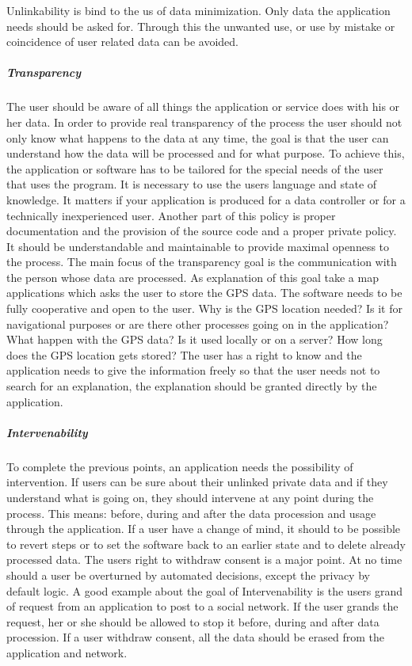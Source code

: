 Unlinkability is bind to the us of data minimization. Only data the application needs should be asked for. Through this the unwanted use, or use by mistake or coincidence of user related data can be avoided.


\subparagraph{Transparency}
The user should be aware of all things the application or service does with his or her data. In order to provide real transparency of the process the user should not only know what happens to the data at any time, the goal is that the user can understand how the data will be processed and for what purpose. To achieve this, the application or software has to be tailored for the special needs of the user that uses the program. It is necessary to use the users language and state of knowledge. It matters if your application is produced for a data controller or for a technically inexperienced user. Another part of this policy is proper documentation and the provision of the source code and a proper private policy. It should be understandable and maintainable to provide maximal openness to the process. The main focus of the transparency goal is the communication with the person whose data are processed. As explanation of this goal take a map applications which asks the user to store the GPS data. The software needs to be fully cooperative and open to the user. Why is the GPS location needed? Is it for navigational purposes or are there other processes going on in the application? What happen with the GPS data? Is it used locally or on a server? How long does the GPS location gets stored? The user has a right to know and the application needs to give the information freely so that the user needs not to search for an explanation, the explanation should be granted directly by the application. 

\subparagraph{Intervenability}
To complete the previous points, an application needs the possibility of intervention. If users can be sure about their unlinked private data and if they understand what is going on, they should intervene at any point during the process. This means: before, during and after the data procession and usage through the application. If a user have a change of mind, it should to be possible to revert steps or to set the software back to an earlier state and to delete already processed data. The users right to withdraw consent is a major point. At no time should a user be overturned by automated decisions, except the privacy by default logic. A good example about the goal of Intervenability is the users grand of request from an application to post to a social network. If the user grands the request, her or she should be allowed to stop it before, during and after data procession. If a user withdraw consent, all the data should be erased from the application and network. 


